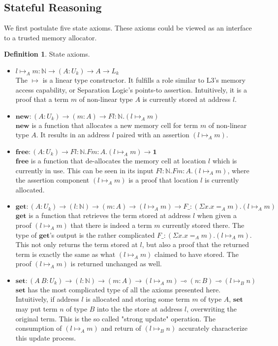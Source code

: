 \documentclass[sigplan,screen]{acmart}
\theoremstyle{definition}
\newtheorem{definition}{Definition}[section]
\newcommand{\new}{\textbf{new}}
\newcommand{\free}{\textbf{free}}
\newcommand{\get}{\textbf{get}}
\newcommand{\set}{\textbf{set}}
\begin{document}
  \subsection{Stateful Reasoning}
  We first postulate five state axioms. These axioms could be viewed as an interface to a trusted memory allocator.
  \begin{definition}
    State axioms.
    \begin{itemize}
      \item $l \mapsto_A m : \mathbb{N} \rightarrow (A : U_k) \rightarrow A \rightarrow L_k$ \\
      The $\mapsto$ is a linear type constructor. It fulfills a role similar to L3's \cite{l3} memory access capability, or Separation Logic's \cite{reynolds02} points-to assertion. Intuitively, it is a proof that a term $m$ of non-linear type $A$ is currently stored at address $l$.
      \item $\new : (A : U_k) \rightarrow (m : A) \rightarrow F l:\mathbb{N}.(l \mapsto_A m)$ \\
      $\new$ is a function that allocates a new memory cell for term $m$ of non-linear type $A$. It results in an address $l$ paired with an assertion $(l \mapsto_A m)$.
      \item $\free : (A : U_k) \rightarrow F l:\mathbb{N}.F m:A.(l \mapsto_A m) \rightarrow \mathbf{1}$ \\
      $\free$ is a function that de-allocates the memory cell at location $l$ which is currently in use. This can be seen in its input $F l:\mathbb{N}.F m:A.(l \mapsto_A m)$, where the assertion component $(l \mapsto_A m)$ is a proof that location $l$ is currently allocated.
      \item $\get : (A : U_k) \rightarrow (l : \mathbb{N}) \rightarrow (m : A) \rightarrow (l \mapsto_A m) \rightarrow F \_: (\Sigma x. x =_A m). (l \mapsto_A m)$ \\
      $\get$ is a function that retrieves the term stored at address $l$ when given a proof $(l \mapsto_A m)$ that there is indeed a term $m$ currently stored there. The type of $\get$'s output is the rather complicated $F \_: (\Sigma x. x =_A m). (l \mapsto_A m)$. This not only returns the term stored at $l$, but also a proof that the returned term is exactly the same as what $(l \mapsto_A m)$ claimed to have stored. The proof $(l \mapsto_A m)$ is returned unchanged as well.
      \item $\set : (A\ B : U_k) \rightarrow (l : \mathbb{N}) \rightarrow (m : A) \rightarrow (l \mapsto_A m) \multimap (n : B) \multimap (l \mapsto_B n)$ \\
      $\set$ has the most complicated type of all the axioms presented here. Intuitively, if address $l$ is allocated and storing some term $m$ of type $A$, $\set$ may put term $n$ of type $B$ into the the store at address $l$, overwriting the original term. This is the so called "strong update" operation. The consumption of $(l \mapsto_A m)$ and return of $(l \mapsto_B n)$ accurately characterize this update process.
    \end{itemize}
  \end{definition}
\end{document}
